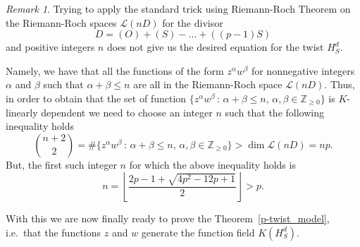 \documentclass[a4paper, 12pt]{amsart}
\theoremstyle{definition}
\theoremstyle{remark}
\newtheorem{remark}[theorem]{Remark}
\newcommand{\whichbold}[1]{\mathbb{#1}} %
\newcommand{\Z}{\whichbold{Z}}
\numberwithin{equation}{section}
\begin{document}
\begin{remark}
    Trying to apply the standard trick using Riemann-Roch Theorem on the Riemann-Roch spaces $\mathcal{L}(nD)$ for the divisor 
    \[
        D = (O)+(S)-\dotso +((p-1)S)
    \]
    and positive integers $n$ does not give us the desired equation for the twist $H_S^d$. 
    
    Namely, we have that all the functions of the form $z^\alpha w^\beta$ for nonnegative integers $\alpha$ and $\beta$ such that $\alpha+\beta \leq n$ are all in the Riemann-Roch space $\mathcal{L}(nD)$. Thus, in order to obtain that the set of function $\{z^\alpha w^\beta\,:\, \alpha + \beta \leq n,\, \alpha, \beta \in \Z_{\geq 0}\}$ is $K$-linearly dependent we need to choose an integer $n$ such that the following inequality holds
    \[
        \binom{n+2}{2} = \#\{z^\alpha w^\beta\,:\, \alpha + \beta \leq n,\, \alpha, \beta \in \Z_{\geq 0}\} > \dim \mathcal{L}(nD) =np.
    \]
    But, the first such integer $n$ for which the above inequality holds is 
    \[
        n = \left\lfloor\dfrac{2p-1+\sqrt{4p^2-12p+1}}{2}\right\rfloor >p.
    \]
\end{remark}

With this we are now finally ready to prove the Theorem~\ref{p-twist_model}, i.e.\ that the functions $z$ and $w$ generate the function field $K(H_S^d)$.
\end{document}
